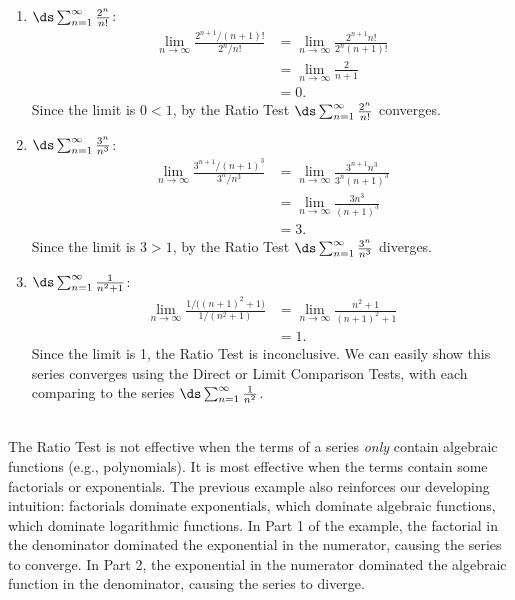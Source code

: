{\begin{enumerate}
	\item $\ds \sum_{n=1}^\infty \frac{2^n}{n!}$:
	\begin{align*}
	\lim_{n\to\infty}\frac{2^{n+1}/(n+1)!}{2^n/n!} &= \lim_{n\to\infty} \frac{2^{n+1}n!}{2^n(n+1)!}\\
				&= \lim_{n\to\infty} \frac{2}{n+1}\\
				&=0.
	\end{align*}
	Since the limit is $0<1$, by the Ratio Test $\ds\sum_{n=1}^\infty \frac{2^n}{n!}$ converges.
	
	\item	$\ds\sum_{n=1}^\infty \frac{3^n}{n^3}$:
	\begin{align*}
	\lim_{n\to\infty} \frac{3^{n+1}/(n+1)^3}{3^n/n^3} &= \lim_{n\to\infty}\frac{3^{n+1}n^3}{3^n(n+1)^3}\\
				&= \lim_{n\to\infty} \frac{3n^3}{(n+1)^3}\\
				&= 3.
	\end{align*}
	Since the limit is $3>1$, by the Ratio Test $\ds\sum_{n=1}^\infty \frac{3^n}{n^3}$ diverges.
	
	\item  $\ds\sum_{n=1}^\infty \frac{1}{n^2+1}$:
	\begin{align*}
	\lim_{n\to\infty} \frac{1/\big((n+1)^2+1\big)}{1/(n^2+1)} &= \lim_{n\to\infty} \frac{n^2+1}{(n+1)^2+1}\\
				&= 1.
	\end{align*}
	Since the limit is 1, the Ratio Test is inconclusive. We can easily show this series converges using the Direct or Limit Comparison Tests, with each comparing to the series $\ds \sum_{n=1}^\infty \frac{1}{n^2}$.
\end{enumerate}
}\\

The Ratio Test is not effective when the terms of a series \textit{only} contain algebraic functions (e.g., polynomials). It is most effective when the terms contain some factorials or exponentials. The previous example also reinforces our developing intuition: factorials dominate exponentials, which dominate algebraic functions, which dominate logarithmic functions. In Part 1 of the example, the factorial in the denominator dominated the exponential in the numerator, causing the series to converge. In Part 2, the exponential in the numerator dominated the algebraic function in the denominator, causing the series to diverge.

